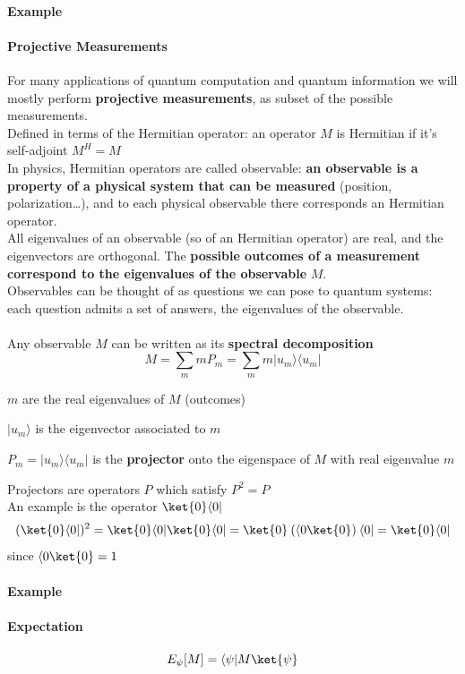 \documentclass[10pt]{report}
\begin{document}
\paragraph{Example} %
\paragraph{Projective Measurements} For many applications of quantum computation and quantum information we will mostly perform \textbf{projective measurements}, as subset of the possible measurements.\\
Defined in terms of the Hermitian operator: an operator $M$ is Hermitian if it's self-adjoint $M^H = M$\\
In physics, Hermitian operators are called observable: \textbf{an observable is a property of a physical system that can be measured} (position, polarization\ldots), and to each physical observable there corresponds an Hermitian operator.\\
All eigenvalues of an observable (so of an Hermitian operator) are real, and the eigenvectors are orthogonal. The \textbf{possible outcomes of a measurement correspond to the eigenvalues of the observable} $M$.\\
Observables can be thought of as questions we can pose to quantum systems: each question admits a set of answers, the eigenvalues of the observable.\\\\Any observable $M$ can be written as its \textbf{spectral decomposition} $$M = \sum_m mP_m = \sum_m m|u_m\rangle\langle u_m|$$
\begin{list}{}{}
	\item $m$ are the real eigenvalues of $M$ (outcomes)
	\item $|u_m\rangle$ is the eigenvector associated to $m$
	\item $P_m = |u_m\rangle\langle u_m|$ is the \textbf{projector} onto the eigenspace of $M$ with real eigenvalue $m$
\end{list}
Projectors are operators $P$ which satisfy $P^2 = P$\\
An example is the operator $\ket{0}\langle0|$ $$(\ket{0}\langle0|)^2 = \ket{0}\langle0|\ket{0}\langle0| = \ket{0}\:(\langle0\ket{0})\:\langle0| = \ket{0}\langle0|$$ since $\langle0\ket{0} = 1$
\paragraph{Example} %
\paragraph{Expectation}
$$E_\psi[M] = \langle\psi|M\ket{\psi}$$
\end{document}
